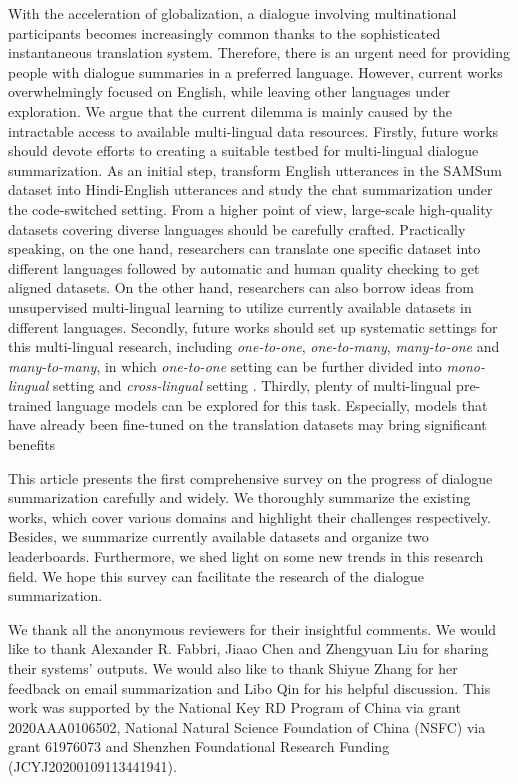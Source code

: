 With the acceleration of globalization, a dialogue involving multinational participants becomes increasingly common thanks to the sophisticated instantaneous translation system. Therefore, there is an urgent need for providing people with dialogue summaries in a preferred language. However, current works overwhelmingly focused on English, while leaving other languages under exploration. We argue that the current dilemma is mainly caused by the intractable access to available multi-lingual data resources.
Firstly, future works should devote efforts to creating a suitable testbed for multi-lingual dialogue summarization. As an initial step,  transform English utterances in the SAMSum dataset into Hindi-English utterances and study the chat summarization under the code-switched setting. 
From a higher point of view, large-scale high-quality datasets covering diverse languages should be carefully crafted.
Practically speaking, on the one hand, researchers can translate one specific dataset into different languages followed by automatic and human quality checking to get aligned datasets. On the other hand, researchers can also borrow ideas from unsupervised multi-lingual learning to utilize currently available datasets in different languages. Secondly, future works should set up systematic settings for this multi-lingual research, including \textit{one-to-one}, \textit{one-to-many}, \textit{many-to-one} and \textit{many-to-many}, in which \textit{one-to-one} setting can be further divided into \textit{mono-lingual} setting and \textit{cross-lingual} setting . Thirdly, plenty of multi-lingual pre-trained language models can be explored for this task. Especially, models that have already been fine-tuned on the translation datasets may bring significant benefits

\label{sec:con}
This article presents the first comprehensive survey on the progress of dialogue summarization carefully and widely. 
We thoroughly summarize the existing works, which cover various domains and highlight their challenges respectively. Besides, we summarize currently available datasets and organize two leaderboards.
Furthermore, we shed light on some new trends in this research field.
We hope this survey can facilitate the research of the dialogue summarization.
\appendix

We thank all the anonymous reviewers for their insightful comments. We would like to thank Alexander R. Fabbri, Jiaao Chen and Zhengyuan Liu for sharing their systems’ outputs. We would also like to thank Shiyue Zhang for her feedback on email summarization and Libo Qin for his helpful discussion. This work was supported by the National Key RD Program of China via grant 2020AAA0106502, National Natural Science Foundation of China (NSFC) via grant 61976073 and Shenzhen Foundational Research Funding (JCYJ20200109113441941).
\small


